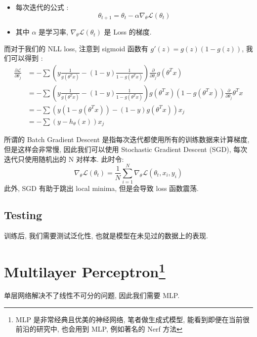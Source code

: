 \documentclass[lang=cn,10pt,green]{elegantbook}
\begin{document}
\begin{definition}
    \begin{itemize}
        \item 每次迭代的公式 :
        $$\theta_{t+1} = \theta_t - \alpha \nabla_{\theta} \mathcal{L}(\theta_t)$$
        \item 其中 $\alpha$ 是学习率, $\nabla_{\theta} \mathcal{L}(\theta_t)$ 是 Loss 的梯度.
    \end{itemize}
\end{definition}

\begin{note}
而对于我们的 NLL loss, 注意到 sigmoid 函数有 $g'(z) = g(z)(1-g(z))$, 我们可以得到 :
$$\begin{aligned}\frac{\partial\mathcal{L}}{\partial\theta_{j}}&=-\sum\left(y\frac1{g(\theta^Tx)}-(1-y)\frac1{1-g(\theta^Tx)}\right)\frac\partial{\partial\theta_j}g(\theta^Tx)\\&=-\sum\left(y\frac1{g(\theta^Tx)}-(1-y)\frac1{1-g(\theta^Tx)}\right)g(\theta^Tx)(1-g(\theta^Tx))\frac\partial{\partial\theta_j}\theta^Tx\\&=-\sum\left(y(1-g(\theta^Tx))-(1-y)g(\theta^Tx)\right)x_j\\&=-\sum\left(y-h_\theta(x)\right)x_j\end{aligned}
$$
\end{note}
\begin{theorem}
    所谓的 Batch Gradient Descent 是指每次迭代都使用所有的训练数据来计算梯度, 但是这样会非常慢, 因此我们可以使用 Stochastic Gradient Descent (SGD), 每次迭代只使用随机出的 N 对样本. 此时令:
    $$\nabla_{\theta} \mathcal{L}(\theta_t) = \frac{1}{N}\sum_{i=1}^N \nabla_{\theta} \mathcal{L}(\theta_t, x_i, y_i)$$
    此外, SGD 有助于跳出 local minima, 但是会导致 loss 函数震荡.
\end{theorem}

\subsection{Testing}
训练后, 我们需要测试泛化性, 也就是模型在未见过的数据上的表现.

\section{Multilayer Perceptron\footnote{MLP 是非常经典且优美的神经网络, 笔者做生成式模型, 能看到即便在当前很前沿的研究中, 也会用到 MLP, 例如著名的 Nerf 方法}}
\begin{note}
    单层网络解决不了线性不可分的问题, 因此我们需要 MLP. 
\end{note}
\end{document}
